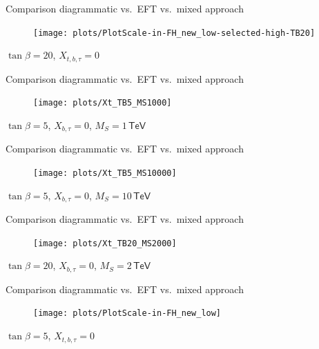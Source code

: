 \documentclass[hyperref={pdfpagelabels=false},ngerman]{beamer}
\newcommand{\eh}[1]{\,\mathsf{#1}}
\begin{document}
\begin{frame}[noframenumbering]{Comparison diagrammatic vs.\ EFT vs.\ mixed approach}
  \begin{figure}
    \centering
    \texttt{[image: plots/PlotScale-in-FH\_new\_low-selected-high-TB20]}
  \end{figure}
  $\tan\beta = 20$, $X_{t,b,\tau} = 0$
\end{frame}

\begin{frame}[noframenumbering]{Comparison diagrammatic vs.\ EFT vs.\ mixed approach}
  \begin{figure}
    \centering
    \texttt{[image: plots/Xt\_TB5\_MS1000]}
  \end{figure}
  $\tan\beta = 5$, $X_{b,\tau} = 0$, $M_S = 1\eh{TeV}$
\end{frame}

\begin{frame}[noframenumbering]{Comparison diagrammatic vs.\ EFT vs.\ mixed approach}
  \begin{figure}
    \centering
    \texttt{[image: plots/Xt\_TB5\_MS10000]}
  \end{figure}
  $\tan\beta = 5$, $X_{b,\tau} = 0$, $M_S = 10\eh{TeV}$
\end{frame}

\begin{frame}[noframenumbering]{Comparison diagrammatic vs.\ EFT vs.\ mixed approach}
  \begin{figure}
    \centering
    \texttt{[image: plots/Xt\_TB20\_MS2000]}
  \end{figure}
  $\tan\beta = 20$, $X_{b,\tau} = 0$, $M_S = 2\eh{TeV}$
\end{frame}

\begin{frame}[noframenumbering]{Comparison diagrammatic vs.\ EFT vs.\ mixed approach}
  \begin{figure}
    \centering
    \texttt{[image: plots/PlotScale-in-FH\_new\_low]}
  \end{figure}
  $\tan\beta = 5$, $X_{t,b,\tau} = 0$
\end{frame}

\end{document}

